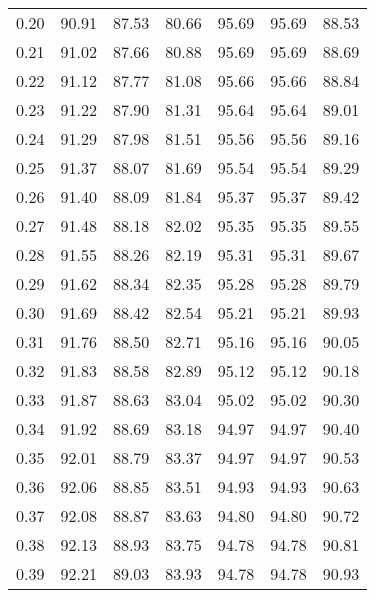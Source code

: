 \begin{tabular}{|c|c|c|c|c|c|c|}
      0.20 &     90.91 &     87.53 &      80.66 &   95.69 &      95.69 &         88.53 \\
      0.21 &     91.02 &     87.66 &      80.88 &   95.69 &      95.69 &         88.69 \\
      0.22 &     91.12 &     87.77 &      81.08 &   95.66 &      95.66 &         88.84 \\
      0.23 &     91.22 &     87.90 &      81.31 &   95.64 &      95.64 &         89.01 \\
      0.24 &     91.29 &     87.98 &      81.51 &   95.56 &      95.56 &         89.16 \\
      0.25 &     91.37 &     88.07 &      81.69 &   95.54 &      95.54 &         89.29 \\
      0.26 &     91.40 &     88.09 &      81.84 &   95.37 &      95.37 &         89.42 \\
      0.27 &     91.48 &     88.18 &      82.02 &   95.35 &      95.35 &         89.55 \\
      0.28 &     91.55 &     88.26 &      82.19 &   95.31 &      95.31 &         89.67 \\
      0.29 &     91.62 &     88.34 &      82.35 &   95.28 &      95.28 &         89.79 \\
      0.30 &     91.69 &     88.42 &      82.54 &   95.21 &      95.21 &         89.93 \\
      0.31 &     91.76 &     88.50 &      82.71 &   95.16 &      95.16 &         90.05 \\
      0.32 &     91.83 &     88.58 &      82.89 &   95.12 &      95.12 &         90.18 \\
      0.33 &     91.87 &     88.63 &      83.04 &   95.02 &      95.02 &         90.30 \\
      0.34 &     91.92 &     88.69 &      83.18 &   94.97 &      94.97 &         90.40 \\
      0.35 &     92.01 &     88.79 &      83.37 &   94.97 &      94.97 &         90.53 \\
      0.36 &     92.06 &     88.85 &      83.51 &   94.93 &      94.93 &         90.63 \\
      0.37 &     92.08 &     88.87 &      83.63 &   94.80 &      94.80 &         90.72 \\
      0.38 &     92.13 &     88.93 &      83.75 &   94.78 &      94.78 &         90.81 \\
      0.39 &     92.21 &     89.03 &      83.93 &   94.78 &      94.78 &         90.93 \\

\end{tabular}
